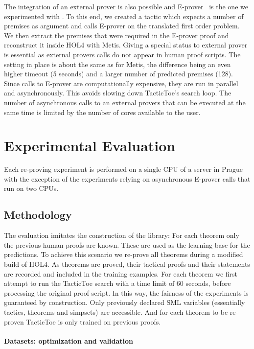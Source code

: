 \documentclass[runningheads,a4paper,draft]{svjour3}
\newcommand{\todoi}[1]{\todo[inline]{#1}}
\def\holfour{\textsf{HOL4}\xspace}
\def\eprover{\textsf{E-prover}\xspace}
\def\sml{\textsf{SML}\xspace}
\def\metis{\textsf{Metis}\xspace}
\def\tactictoe{\textsf{TacticToe}\xspace}
\begin{document}
The integration of an external prover is also possible and 
\eprover~\cite{eprover} is the one we experimented with .
To this end, we created a tactic which expects a number of premises as argument 
and calls \eprover on the translated first order problem. We then extract the
premises that were required in the \eprover 
proof and reconstruct it inside \holfour with \metis. Giving a special status 
to external 
prover is essential as external provers calls do not appear in human
proof scripts. The setting in place is about the same as for \metis, the 
difference being an even higher timeout (5 seconds) and a larger number of 
predicted premises (128). Since calls to \eprover are
computationally expensive, they are run in parallel and asynchronously. This 
avoids slowing down \tactictoe's search loop. The number of asynchronous calls 
to an external provers that can be executed at the same time is limited by the 
number of cores available to the user.


\section{Experimental Evaluation}\label{s:experiments}
Each re-proving experiment is performed on a single CPU of a server in Prague 
with the exception of the experiments 
relying on asynchronous \eprover calls that run on two CPUs.


\subsection{Methodology} 
The evaluation imitates the construction of the library: For each theorem only 
the previous human proofs are known. These are used as the learning base for 
the predictions.
To achieve this scenario we re-prove all theorems during a modified build of 
\holfour.
As theorems are proved, their tactical proofs and their statements are 
recorded and included in the training examples.
For each theorem we first attempt to run the \tactictoe search with a time 
limit of 60 seconds, before processing the original proof script.
In this way, the fairness of the experiments is guaranteed by construction. 
Only previously declared \sml 
variables (essentially tactics, theorems and simpsets) are accessible. 
And for each theorem to be re-proven \tactictoe is only trained on previous 
proofs.

\todoi{rephrase to something more coherent}
\paragraph{Datasets: optimization and validation}
\end{document}
